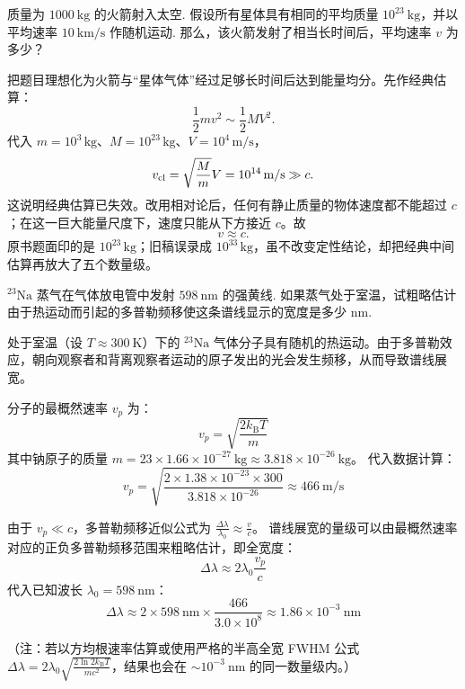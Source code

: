 \begin{exercise}\label{ex:13.1}质量为 $1000 \ \mathrm{kg}$ 的火箭射入太空. 假设所有星体具有相同的平均质量 $10^{23} \ \mathrm{kg}$，并以平均速率 $10 \ \mathrm{km/s}$ 作随机运动. 那么，该火箭发射了相当长时间后，平均速率 $v$ 为多少？ \end{exercise}
\begin{solution}
把题目理想化为火箭与“星体气体”经过足够长时间后达到能量均分。先作经典估算：
$$
\frac12mv^2\sim\frac12MV^2.
$$
代入 $m=10^3\,\mathrm{kg}$、$M=10^{23}\,\mathrm{kg}$、$V=10^4\,\mathrm{m/s}$，
$$
v_{\rm cl}=\sqrt{\frac{M}{m}}V=10^{14}\,\mathrm{m/s}\gg c.
$$
这说明经典估算已失效。改用相对论后，任何有静止质量的物体速度都不能超过 $c$；在这一巨大能量尺度下，速度只能从下方接近 $c$。故
$$
\boxed{v\approx c}.
$$
原书题面印的是 $10^{23}\,\mathrm{kg}$；旧稿误录成 $10^{33}\,\mathrm{kg}$，虽不改变定性结论，却把经典中间估算再放大了五个数量级。
\end{solution}

\begin{exercise}\label{ex:13.2}
$^{23}\mathrm{Na}$ 蒸气在气体放电管中发射 $598 \ \mathrm{nm}$ 的强黄线. 如果蒸气处于室温，试粗略估计由于热运动而引起的多普勒频移使这条谱线显示的宽度是多少 $\mathrm{nm}$.
\end{exercise}
\begin{solution}
处于室温（设 $T \approx 300 \ \mathrm{K}$）下的 $^{23}\mathrm{Na}$ 气体分子具有随机的热运动。由于多普勒效应，朝向观察者和背离观察者运动的原子发出的光会发生频移，从而导致谱线展宽。

分子的最概然速率 $v_p$ 为：
$$ v_p = \sqrt{\frac{2 k_{\mathrm{B}} T}{m}} $$
其中钠原子的质量 $m = 23 \times 1.66 \times 10^{-27} \ \mathrm{kg} \approx 3.818 \times 10^{-26} \ \mathrm{kg}$。
代入数据计算：
$$ v_p = \sqrt{\frac{2 \times 1.38 \times 10^{-23} \times 300}{3.818 \times 10^{-26}}} \approx 466 \ \mathrm{m/s} $$

由于 $v_p \ll c$，多普勒频移近似公式为 $\frac{\Delta \lambda}{\lambda_0} \approx \frac{v}{c}$。
谱线展宽的量级可以由最概然速率对应的正负多普勒频移范围来粗略估计，即全宽度：
$$ \Delta \lambda \approx 2 \lambda_0 \frac{v_p}{c} $$
代入已知波长 $\lambda_0 = 598 \ \mathrm{nm}$：
$$ \Delta \lambda \approx 2 \times 598 \ \mathrm{nm} \times \frac{466}{3.0 \times 10^8} \approx 1.86 \times 10^{-3} \ \mathrm{nm} $$

（注：若以方均根速率估算或使用严格的半高全宽 FWHM 公式 $\Delta \lambda = 2\lambda_0 \sqrt{\frac{2 \ln 2 k_{\mathrm{B}} T}{mc^2}}$，结果也会在 $\sim 10^{-3} \ \mathrm{nm}$ 的同一数量级内。）
\end{solution}

